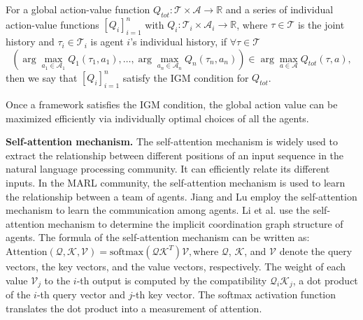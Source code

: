     \begin{definition}
        For a global action-value function $Q_{tot} : \mathcal{T} \times \mathcal{A} \to \mathbb{R}$ and a series of individual action-value functions $[Q_i]_{i=1}^n$ with $Q_i : \mathcal{T}_i \times \mathcal{A}_i \to \mathbb{R}$, where $\tau \in \mathcal{T}$ is the joint history and $\tau_i \in \mathcal{T}_i$ is agent $i$'s individual history, if $\forall \tau \in \mathcal{T}$
        \[
            \left(\arg\max_{a_1 \in \mathcal{A}_1} Q_1(\tau_1,a_1),\ldots, \arg\max_{a_n\in \mathcal{A}_n} Q_n(\tau_n,a_n)\right) \in \arg\max_{a \in \mathcal{A}} Q_{tot}(\tau,a),
        \]
        then we say that $[Q_i]_{i=1}^n$ satisfy the IGM condition for $Q_{tot}$.
    \end{definition}

    Once a framework satisfies the IGM condition, the global action value can be maximized efficiently via individually optimal choices of all the agents.

    \textbf{Self-attention mechanism.} 
    The self-attention mechanism \cite{r5} is widely used to extract the relationship between different positions of an input sequence in the natural language processing community. It can efficiently relate its different inputs. In the MARL community, the self-attention mechanism is used to learn the relationship between a team of agents. Jiang and Lu \cite{r6} employ the self-attention mechanism to learn the communication among agents. Li et al. \cite{r7} use the self-attention mechanism to determine the implicit coordination graph structure of agents. The formula of the self-attention mechanism can be written as:$
    \text{Attention}(\mathcal{Q}, \mathcal{K}, \mathcal{V}) = \text{softmax}(\mathcal{Q}\mathcal{K}^T)\mathcal{V},
    $where $\mathcal{Q}$, $\mathcal{K}$, and $\mathcal{V}$ denote the query vectors, the key vectors, and the value vectors, respectively. The weight of each value $\mathcal{V}_j$ to the $i$-th output is computed by the compatibility $\mathcal{Q}_i\mathcal{K}_j$, a dot product of the $i$-th query vector and $j$-th key vector. The softmax activation function translates the dot product into a measurement of attention.
    